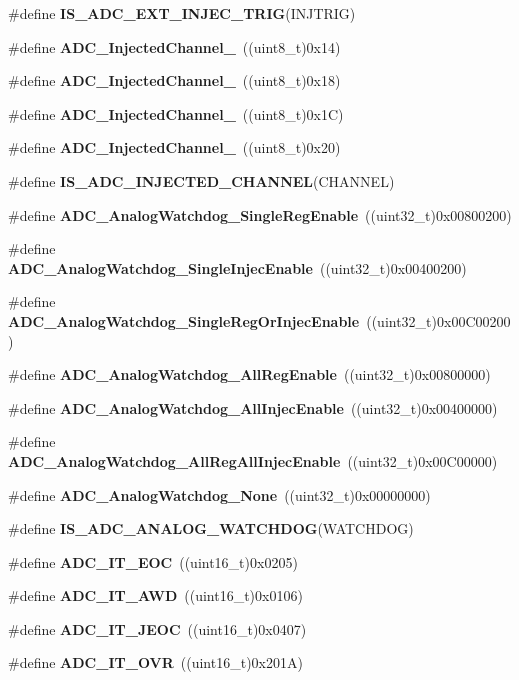 \begin{DoxyCompactItemize}
\item 
\#define \textbf{ I\+S\+\_\+\+A\+D\+C\+\_\+\+E\+X\+T\+\_\+\+I\+N\+J\+E\+C\+\_\+\+T\+R\+IG}(I\+N\+J\+T\+R\+IG)
\item 
\#define \textbf{ A\+D\+C\+\_\+\+Injected\+Channel\+\_}~((uint8\+\_\+t)0x14)
\item 
\#define \textbf{ A\+D\+C\+\_\+\+Injected\+Channel\+\_}~((uint8\+\_\+t)0x18)
\item 
\#define \textbf{ A\+D\+C\+\_\+\+Injected\+Channel\+\_}~((uint8\+\_\+t)0x1\+C)
\item 
\#define \textbf{ A\+D\+C\+\_\+\+Injected\+Channel\+\_}~((uint8\+\_\+t)0x20)
\item 
\#define \textbf{ I\+S\+\_\+\+A\+D\+C\+\_\+\+I\+N\+J\+E\+C\+T\+E\+D\+\_\+\+C\+H\+A\+N\+N\+EL}(C\+H\+A\+N\+N\+EL)
\item 
\#define \textbf{ A\+D\+C\+\_\+\+Analog\+Watchdog\+\_\+\+Single\+Reg\+Enable}~((uint32\+\_\+t)0x00800200)
\item 
\#define \textbf{ A\+D\+C\+\_\+\+Analog\+Watchdog\+\_\+\+Single\+Injec\+Enable}~((uint32\+\_\+t)0x00400200)
\item 
\#define \textbf{ A\+D\+C\+\_\+\+Analog\+Watchdog\+\_\+\+Single\+Reg\+Or\+Injec\+Enable}~((uint32\+\_\+t)0x00\+C00200)
\item 
\#define \textbf{ A\+D\+C\+\_\+\+Analog\+Watchdog\+\_\+\+All\+Reg\+Enable}~((uint32\+\_\+t)0x00800000)
\item 
\#define \textbf{ A\+D\+C\+\_\+\+Analog\+Watchdog\+\_\+\+All\+Injec\+Enable}~((uint32\+\_\+t)0x00400000)
\item 
\#define \textbf{ A\+D\+C\+\_\+\+Analog\+Watchdog\+\_\+\+All\+Reg\+All\+Injec\+Enable}~((uint32\+\_\+t)0x00\+C00000)
\item 
\#define \textbf{ A\+D\+C\+\_\+\+Analog\+Watchdog\+\_\+\+None}~((uint32\+\_\+t)0x00000000)
\item 
\#define \textbf{ I\+S\+\_\+\+A\+D\+C\+\_\+\+A\+N\+A\+L\+O\+G\+\_\+\+W\+A\+T\+C\+H\+D\+OG}(W\+A\+T\+C\+H\+D\+OG)
\item 
\#define \textbf{ A\+D\+C\+\_\+\+I\+T\+\_\+\+E\+OC}~((uint16\+\_\+t)0x0205)
\item 
\#define \textbf{ A\+D\+C\+\_\+\+I\+T\+\_\+\+A\+WD}~((uint16\+\_\+t)0x0106)
\item 
\#define \textbf{ A\+D\+C\+\_\+\+I\+T\+\_\+\+J\+E\+OC}~((uint16\+\_\+t)0x0407)
\item 
\#define \textbf{ A\+D\+C\+\_\+\+I\+T\+\_\+\+O\+VR}~((uint16\+\_\+t)0x201\+A)
\item 

\end{DoxyCompactItemize}
